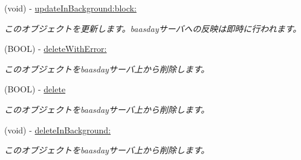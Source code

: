 \begin{DoxyCompactItemize}
(void) -\/ \hyperlink{interface_b_d_object_ae8d683ea58540f92f8aa544d297f608b}{update\-In\-Background\-:block\-:}
\begin{DoxyCompactList}\small\item\em このオブジェクトを更新します。baasdayサーバへの反映は即時に行われます。 \end{DoxyCompactList}\item 
(B\-O\-O\-L) -\/ \hyperlink{interface_b_d_object_a4956ebcf18ad88e8aa333543054093fe}{delete\-With\-Error\-:}
\begin{DoxyCompactList}\small\item\em このオブジェクトをbaasdayサーバ上から削除します。 \end{DoxyCompactList}\item 
(B\-O\-O\-L) -\/ \hyperlink{interface_b_d_object_a98f8e5aad3fb13e207dc4c678e0ef26e}{delete}
\begin{DoxyCompactList}\small\item\em このオブジェクトをbaasdayサーバ上から削除します。 \end{DoxyCompactList}\item 
(void) -\/ \hyperlink{interface_b_d_object_a3315930e8c242cbf0c36dcd539d45a99}{delete\-In\-Background\-:}
\begin{DoxyCompactList}\small\item\em このオブジェクトをbaasdayサーバ上から削除します。 \end{DoxyCompactList}\end{DoxyCompactItemize}
